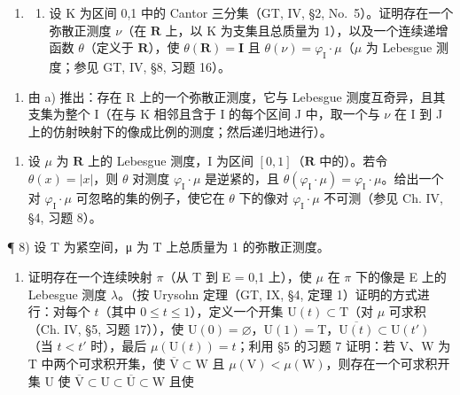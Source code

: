 \begin{enumerate}
\def\labelenumi{\arabic{enumi})}
\setcounter{enumi}{5}
\tightlist
\item
  \begin{enumerate}
  \def\labelenumii{\alph{enumii})}
  \tightlist
  \item
    设 K 为区间 {}0,1{} 中的 Cantor 三分集（GT, IV, §2, No.~5）。证明存在一个弥散正测度 \(\nu\)（在 \(\mathbf{R}\) 上，以 K 为支集且总质量为 1），以及一个连续递增函数 \(\theta\)（定义于 \(\mathbf{R}\)），使 \(\theta(\mathbf{R}) = \mathbf{I}\) 且 \(\theta(\nu) = \varphi_{\mathrm{I}} \cdot \mu\)（\(\mu\) 为 Lebesgue 测度；参见 GT, IV, §8, 习题 16）。
  \end{enumerate}
\end{enumerate}

\begin{enumerate}
\def\labelenumi{\alph{enumi})}
\setcounter{enumi}{1}
\tightlist
\item
  由 a) 推出：存在 R 上的一个弥散正测度，它与 Lebesgue 测度互奇异，且其支集为整个 I（在与 K 相邻且含于 I 的每个区间 J 中，取一个与 \(\nu\) 在 I 到 J 上的仿射映射下的像成比例的测度；然后递归地进行）。
\end{enumerate}

\begin{enumerate}
\def\labelenumi{\arabic{enumi})}
\setcounter{enumi}{6}
\tightlist
\item
  设 \(\mu\) 为 \(\mathbf{R}\) 上的 Lebesgue 测度，I 为区间 \([0,1]\)（\(\mathbf{R}\) 中的）。若令 \(\theta(x) = |x|\)，则 \(\theta\) 对测度 \(\varphi_{\mathrm{I}} \cdot \mu\) 是逆紧的，且 \(\theta(\varphi_{\mathrm{I}} \cdot \mu) = \varphi_{\mathrm{I}} \cdot \mu\)。给出一个对 \(\varphi_{\mathrm{I}} \cdot \mu\) 可忽略的集的例子，使它在 \(\theta\) 下的像对 \(\varphi_{\mathrm{I}} \cdot \mu\) 不可测（参见 Ch. IV, §4, 习题 8）。
\end{enumerate}

¶ 8) 设 T 为紧空间，μ 为 T 上总质量为 1 的弥散正测度。

\begin{enumerate}
\def\labelenumi{\alph{enumi})}
\tightlist
\item
  证明存在一个连续映射 \(\pi\)（从 T 到 E = {}0,1{} 上），使 \(\mu\) 在 \(\pi\) 下的像是 E 上的 Lebesgue 测度 \(\lambda\)。（按 Urysohn 定理（GT, IX, §4, 定理 1）证明的方式进行：对每个 \(t\)（其中 \(0 \leqslant t \leqslant 1\)），定义一个开集 \(\mathrm{U}(t) \subset \mathrm{T}\)（对 \(\mu\) 可求积（Ch. IV, §5, 习题 17）），使 \(\mathrm{U}(0) = \varnothing\)，\(\mathrm{U}(1) = \mathrm{T}\)，\(\overline{\mathrm{U}(t)} \subset \mathrm{U}(t')\)（当 \(t < t'\) 时），最后 \(\mu(\mathrm{U}(t)) = t\)；利用 §5 的习题 7 证明：若 V、W 为 T 中两个可求积开集，使 \(\overline{\mathrm{V}} \subset \mathrm{W}\) 且 \(\mu(\mathrm{V}) < \mu(\mathrm{W})\)，则存在一个可求积开集 U 使 \(\overline{\mathrm{V}} \subset \mathrm{U} \subset \overline{\mathrm{U}} \subset \mathrm{W}\) 且使
\end{enumerate}

